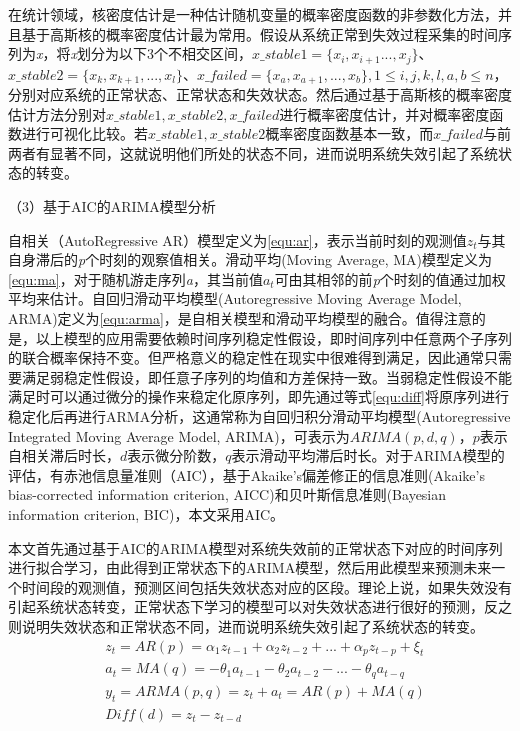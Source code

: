 在统计领域，核密度估计是一种估计随机变量的概率密度函数的非参数化方法，并且基于高斯核的概率密度估计最为常用。假设从系统正常到失效过程采集的时间序列为\emph{x}，将\emph{x}划分为以下3个不相交区间，$x\_stable1=\{x_{i},x_{i+1}...,x_{j}\}$、$x\_stable2=\{x_{k},x_{k+1},...,x_{l}\}$、$x\_failed=\{x_{a},x_{a+1},...,x_{b}\}, 1 \leqslant i,j,k,l,a,b \leqslant n$，分别对应系统的正常状态、正常状态和失效状态。然后通过基于高斯核的概率密度估计方法分别对$x\_stable1, x\_stable2,x\_failed$进行概率密度估计，并对概率密度函数进行可视化比较。若$x\_stable1, x\_stable2$概率密度函数基本一致，而$x\_failed$与前两者有显著不同，这就说明他们所处的状态不同，进而说明系统失效引起了系统状态的转变。

（3）基于AIC的ARIMA模型分析

自相关（AutoRegressive AR）模型定义为\ref{equ:ar}，表示当前时刻的观测值$z_{t}$与其自身滞后的\emph{p}个时刻的观察值相关。滑动平均(Moving Average, MA)模型定义为\ref{equ:ma}，对于随机游走序列\emph{a}，其当前值$a_{t}$可由其相邻的前\emph{p}个时刻的值通过加权平均来估计。自回归滑动平均模型(Autoregressive Moving Average Model, ARMA)定义为\ref{equ:arma}，是自相关模型和滑动平均模型的融合。值得注意的是，以上模型的应用需要依赖时间序列稳定性假设，即时间序列中任意两个子序列的联合概率保持不变。但严格意义的稳定性在现实中很难得到满足，因此通常只需要满足弱稳定性假设，即任意子序列的均值和方差保持一致。当弱稳定性假设不能满足时可以通过微分的操作来稳定化原序列，即先通过等式\ref{equ:diff}将原序列进行稳定化后再进行ARMA分析，这通常称为自回归积分滑动平均模型(Autoregressive Integrated Moving Average Model, ARIMA)，可表示为$ARIMA(p,d,q)$，$p$表示自相关滞后时长，$d$表示微分阶数，$q$表示滑动平均滞后时长。对于ARIMA模型的评估，有赤池信息量准则（AIC），基于Akaike’s偏差修正的信息准则(Akaike’s bias-corrected information criterion, AICC)和贝叶斯信息准则(Bayesian information criterion, BIC)，本文采用AIC。

本文首先通过基于AIC的ARIMA模型对系统失效前的正常状态下对应的时间序列进行拟合学习，由此得到正常状态下的ARIMA模型，然后用此模型来预测未来一个时间段的观测值，预测区间包括失效状态对应的区段。理论上说，如果失效没有引起系统状态转变，正常状态下学习的模型可以对失效状态进行很好的预测，反之则说明失效状态和正常状态不同，进而说明系统失效引起了系统状态的转变。
\begin{subequations}
\begin{align}
& z_{t}=AR(p) = \alpha_{1}z_{t-1} + \alpha_{2}z_{t-2} + ... + \alpha_{p}z_{t-p} + \xi _{t} \label{equ:ar} \\[0.1cm]
& a_{t}=MA(q) = - \theta_{1}a_{t-1} - \theta_{2}a_{t-2} - ... - \theta_{q}a_{t-q} \label{equ:ma}\\[0.1cm]
& y_{t}=ARMA(p, q) =z_{t} + a_{t} = AR(p) + MA(q) \label{equ:arma} \\[0.1cm]
& Diff(d) = z_{t} - z_{t-d} \label{equ:diff} 
\end{align}
\end{subequations}

